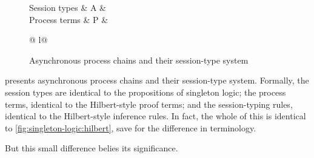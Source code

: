 \begin{figure}[tbp]
  \begin{syntax*}
    Session types &
      A & \alpha \mid {} \mid {}
    \\
    Process terms &
      P &  \mid \fwd
        \begin{array}[t]{@{{} \mid {}}l@{}}
          \selectR{\kay} \mid {} \\
           \mid \selectL{\kay}
        \end{array}
  \end{syntax*}

  \caption{Asynchronous process chains and their session-type system}\label{fig:singleton-processes:typing-rules}
\end{figure}

 presents asynchronous process chains and their session-type system.
Formally, the session types are identical to the propositions of singleton logic; the process terms, identical to the Hilbert-style proof terms; and the session-typing rules, identical to the Hilbert-style inference rules.
In fact, the whole of this  is identical to \cref{fig:singleton-logic:hilbert}, save for the difference in terminology.

But this small difference belies its significance.

